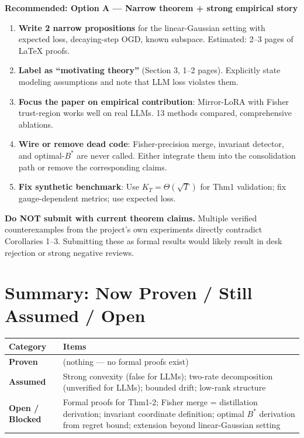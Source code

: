 \documentclass[11pt,a4paper]{article}
\begin{document}
\begin{insightbox}
\textbf{Recommended: Option A --- Narrow theorem + strong empirical story}

\begin{enumerate}
\item \textbf{Write 2 narrow propositions} for the linear-Gaussian
      setting with expected loss, decaying-step OGD, known subspace.
      Estimated: 2--3 pages of LaTeX proofs.
\item \textbf{Label as ``motivating theory''} (Section 3, 1--2 pages).
      Explicitly state modeling assumptions and note that LLM loss
      violates them.
\item \textbf{Focus the paper on empirical contribution}:
      Mirror-LoRA with Fisher trust-region works well on real LLMs.
      13 methods compared, comprehensive ablations.
\item \textbf{Wire or remove dead code}: Fisher-precision merge,
      invariant detector, and optimal-$B^*$ are never called.
      Either integrate them into the consolidation path or remove
      the corresponding claims.
\item \textbf{Fix synthetic benchmark}: Use $K_T = \Theta(\sqrt{T})$
      for Thm1 validation; fix gauge-dependent metrics; use expected loss.
\end{enumerate}
\end{insightbox}

\begin{warningbox}
\textbf{Do NOT submit with current theorem claims.}
Multiple verified counterexamples from the project's own experiments
directly contradict Corollaries 1--3. Submitting these as formal
results would likely result in desk rejection or strong negative reviews.
\end{warningbox}

\section{Summary: Now Proven / Still Assumed / Open}

\begin{center}
\begin{tabular}{lp{10cm}}
\toprule
\textbf{Category} & \textbf{Items} \\
\midrule
\textcolor{green!60!black}{\textbf{Proven}} &
  (nothing --- no formal proofs exist) \\
\midrule
\textcolor{orange!80!black}{\textbf{Assumed}} &
  Strong convexity (false for LLMs); two-rate decomposition (unverified
  for LLMs); bounded drift; low-rank structure \\
\midrule
\textcolor{red!70!black}{\textbf{Open / Blocked}} &
  Formal proofs for Thm1-2; Fisher merge = distillation derivation;
  invariant coordinate definition; optimal $B^*$ derivation from regret
  bound; extension beyond linear-Gaussian setting \\
\bottomrule
\end{tabular}
\end{center}
\end{document}
